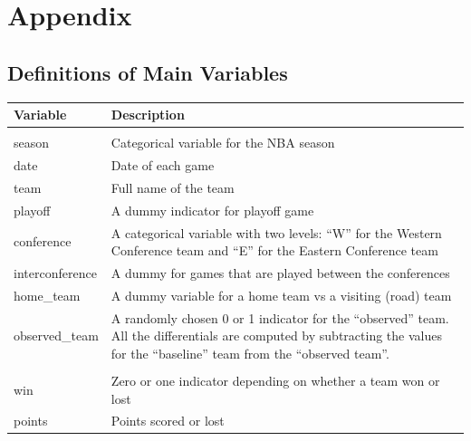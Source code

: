 \documentclass[
    12pt,
    a4paper,
    titlepage,  %
    abstract,  %
    headings=standardclasses,  %
    bibliography=totocnumbered  %
]{scrartcl}
\begin{document}
\section{Appendix}

\subsection{Definitions of Main Variables} \label{definitions}

\begin{longtable}{|>{\ttfamily}l|L{4.17in}|}
    \hline
    \textnormal{\textbf{Variable}} & \textbf{Description} \\ \hline
    \endhead
    
     \\ \hline
    season & Categorical variable for the NBA season \\ \hline
    date & Date of each game \\ \hline
    team & Full name of the team \\ \hline
    playoff & A dummy indicator for playoff game \\ \hline
    conference & A categorical variable with two levels: ``W'' for the Western Conference team and ``E'' for the Eastern Conference team \\ \hline
    interconference & A dummy for games that are played between the conferences \\ \hline
    home\_team & A dummy variable for a home team vs a visiting (road) team \\ \hline
    observed\_team & A randomly chosen 0 or 1 indicator for the ``observed'' team. All the differentials are computed by subtracting the values for the ``baseline'' team from the ``observed team''. \\ \hline
    
     \\ \hline
    win & Zero or one indicator depending on whether a team won or lost \\ \hline
    points & Points scored or lost \\ \hline
    

\end{longtable}
\end{document}
